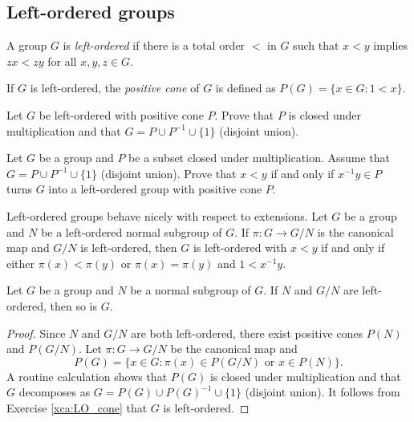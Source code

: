 \begin{graybox}
  \project 
\section{Left-ordered groups}

\begin{definition}
	A group $G$ is \emph{left-ordered} if there is a total order 
	$<$ in $G$ such that $x<y$ implies $zx<zy$ for all $x,y,z\in G$.
\end{definition}

If $G$ is left-ordered, the \emph{positive cone} of $G$ is defined as $P(G)=\{x\in G:1<x\}$. 

\begin{xca}
	Let $G$ be left-ordered with positive cone $P$. Prove that 
	$P$ is closed under multiplication and that 
	$G=P\cup P^{-1}\cup \{1\}$ (disjoint union).
\end{xca}

\begin{xca}
\label{xca:LO_cone}
	Let $G$ be a group and $P$ be a subset closed under multiplication. Assume that 
	$G=P\cup P^{-1}\cup \{1\}$ (disjoint union). Prove that $x<y$ if and only if
	$x^{-1}y\in P$ turns $G$ into a left-ordered group with positive cone $P$.
\end{xca}

Left-ordered groups behave nicely with respect to extensions. Let $G$ be a group
and $N$ be a left-ordered normal subgroup of $G$. If $\pi\colon G\to G/N$ is the 
canonical map and $G/N$ is left-ordered, then
$G$ is left-ordered with
$x<y$ if and only if either $\pi(x)<\pi(y)$ or $\pi(x)=\pi(y)$ and $1<x^{-1}y$. 


\begin{proposition}
	Let $G$ be a group and $N$ be a normal subgroup of $G$. 
	If $N$ and $G/N$ are left-ordered, then so is $G$.
\end{proposition}

\begin{proof}
	Since $N$ and $G/N$ are both left-ordered, there exist positive cones 
	$P(N)$ and $P(G/N)$. Let $\pi\colon G\to G/N$ be the canonical map and 
	\[
		P(G)=\{x\in G:\pi(x)\in P(G/N)\text{ or }x\in P(N)\}.
	\]	
	A routine calculation shows that $P(G)$ is closed under multiplication 
	and that $G$ decomposes as $G=P(G)\cup P(G)^{-1}\cup \{1\}$ (disjoint union). It follows
	from Exercise \ref{xca:LO_cone} that 
	$G$ is left-ordered. 
\end{proof}



\end{graybox}
